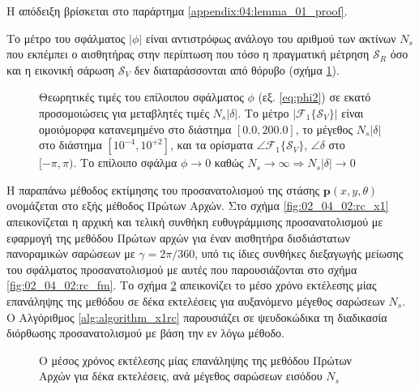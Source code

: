Η απόδειξη βρίσκεται στο παράρτημα \ref{appendix:04:lemma_01_proof}.

\begin{corollary}
  Το μέτρο του σφάλματος $|\phi|$ είναι αντιστρόφως ανάλογο του αριθμού των
  ακτίνων $N_s$ που εκπέμπει ο αισθητήρας στην περίπτωση που τόσο η πραγματική
  μέτρηση $\mathcal{S}_R$ όσο και η εικονική σάρωση $\mathcal{S}_V$ δεν
  διαταράσσονται από θόρυβο (σχήμα \ref{fig:02_04_02:phi_rc_x1}).
\end{corollary}


\begin{figure}[!h]\centering
  \vspace{0.5cm}
  
  \vspace{1.0cm}
  \caption{\small Θεωρητικές τιμές του επίλοιπου σφάλματος $\phi$ (εξ.
           \ref{eq:phi2}) σε εκατό προσομοιώσεις για μεταβλητές τιμές
           $N_s |\delta|$. Το μέτρο $|\mathcal{F}_1\{\mathcal{S}_V\}|$ είναι
           ομοιόμορφα κατανεμημένο στο διάστημα $[0.0, 200.0]$, το μέγεθος
           $N_s |\delta|$ στο διάστημα $[10^{-4}, 10^{+2}]$, και τα ορίσματα
           $\angle \mathcal{F}_1\{\mathcal{S}_V\}$, $\angle \delta$ στο
           $[-\pi, \pi)$. Το επίλοιπο σφάλμα $\phi \rightarrow 0$ καθώς
           $N_s \rightarrow \infty \Rightarrow N_s |\delta| \rightarrow 0$}
  \label{fig:02_04_02:phi_rc_x1}
\end{figure}

Η παραπάνω μέθοδος εκτίμησης του προσανατολισμού της στάσης
$\bm{p}(x,y,\theta)$ ονομάζεται στο εξής μέθοδος Πρώτων Αρχών.  Στο σχήμα
\ref{fig:02_04_02:rc_x1} απεικονίζεται η αρχική και τελική συνθήκη
ευθυγράμμισης προσανατολισμού με εφαρμογή της μεθόδου Πρώτων αρχών για έναν
αισθητήρα δισδιάστατων πανοραμικών σαρώσεων με $\gamma = 2\pi/360$, υπό τις
ίδιες συνθήκες διεξαγωγής μείωσης του σφάλματος προσανατολισμού με αυτές που
παρουσιάζονται στο σχήμα \ref{fig:02_04_02:rc_fm}. Το σχήμα
\ref{fig:02_04_02:rc_x1_exec_time} απεικονίζει το μέσο χρόνο εκτέλεσης
μίας επανάληψης της μεθόδου σε δέκα εκτελέσεις για αυξανόμενο μέγεθος σαρώσεων
$N_s$. Ο Αλγόριθμος \ref{alg:algorithm_x1rc} παρουσιάζει σε ψευδοκώδικα τη
διαδικασία διόρθωσης προσανατολισμού με βάση την εν λόγω μέθοδο.

\begin{figure}[!h]\centering
  
  \caption{\small Ο μέσος χρόνος εκτέλεσης μίας επανάληψης της μεθόδου
           Πρώτων Αρχών για δέκα εκτελέσεις, ανά μέγεθος σαρώσεων εισόδου $N_s$}
  \label{fig:02_04_02:rc_x1_exec_time}
\end{figure}

